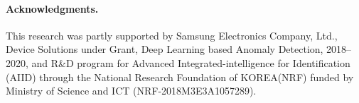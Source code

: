 \documentclass[10pt,twocolumn,letterpaper]{article}
\begin{document}
\vspace{-0.3cm}	
\paragraph{Acknowledgments.}This research was partly supported by Samsung Electronics Company, Ltd., Device Solutions under Grant, Deep Learning based Anomaly Detection, 2018–2020, and R\&D program for Advanced Integrated-intelligence for Identification (AIID) through the National Research Foundation of KOREA(NRF) funded by Ministry of Science and ICT (NRF-2018M3E3A1057289).

\clearpage
{\small


}

\clearpage
\end{document}
